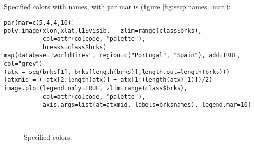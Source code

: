 \documentclass[a4paper,10pt]{article}
\begin{document}
Specified colors with names, with par mar is (figure \ref{fig:secp:names_mar}):

\begin{verbatim}
par(mar=c(5,4,4,10)) 
poly.image(xlon,xlat,l1$visib,   zlim=range(class$brks),
           col=attr(colcode, "palette"), 
           breaks=class$brks)
map(database="worldHires", region=c("Portugal", "Spain"), add=TRUE, col="grey")
(atx = seq(brks[1], brks[length(brks)],length.out=length(brks)))
(atxmid = ( atx[2:length(atx)] + atx[1:(length(atx)-1)])/2)
image.plot(legend.only=TRUE, zlim=range(class$brks), 
           col=attr(colcode, "palette"), 
           axis.args=list(at=atxmid, labels=brksnames), legend.mar=10)
\end{verbatim} 

\begin{figure}[!htp]
  \centering
  \\
  \caption{Specified colors.} 
  \label{fig:spec2}
\end{figure}


% 
\end{document}
